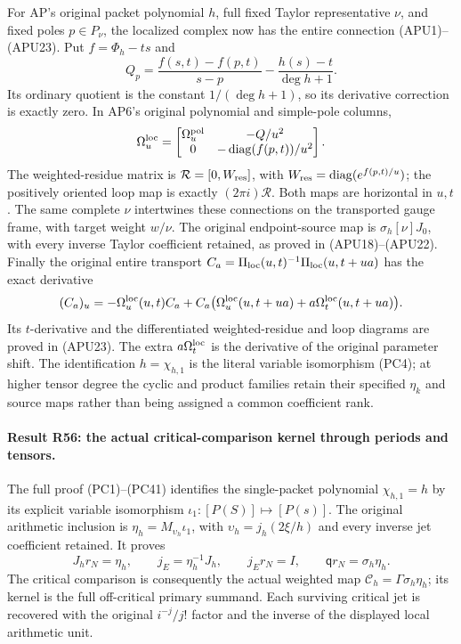 For AP's original packet polynomial \(h\), full fixed Taylor
representative \(\nu\), and fixed poles \(p\in P_\nu\), the
localized complex now has the entire connection
(APU1)--(APU23).  Put \(f=\Phi_h-ts\) and
\[
 Q_p=\frac{f(s,t)-f(p,t)}{s-p}-\frac{h(s)-t}{\deg h+1}.
\]
Its ordinary quotient is the constant \(1/(\deg h+1)\), so
its derivative correction is exactly zero.  In AP6's original
polynomial and simple-pole columns,
\[
 \Omega_u^{\rm loc}
 =\begin{bmatrix}
      \Omega_u^{\rm pol}&-Q/u^2\\
      0&-\operatorname{diag}(f(p,t))/u^2
   \end{bmatrix}.
\]
The weighted-residue matrix is
\(\mathcal R=[0,W_{\rm res}]\), with
\(W_{\rm res}=\operatorname{diag}(e^{f(p,t)/u})\);
the positively oriented loop map is exactly
\((2\pi i)\mathcal R\).
Both maps are horizontal in \(u,t\).
The same complete \(\nu\) intertwines these connections on
the transported gauge frame, with target weight \(w/\nu\).
The original endpoint-source map is
\(\sigma_h[\nu]J_0\), with every inverse Taylor coefficient
retained, as proved in (APU18)--(APU22).
Finally the original entire transport
\(C_a=\Pi_{\rm loc}(u,t)^{-1}\Pi_{\rm loc}(u,t+ua)\)
has the exact derivative
\[
 (C_a)_u=-\Omega_u^{\rm loc}(u,t)C_a+
 C_a\bigl(\Omega_u^{\rm loc}(u,t+ua)
                   +a\Omega_t^{\rm loc}(u,t+ua)\bigr).
\]
Its \(t\)-derivative and the differentiated weighted-residue and
loop diagrams are proved in (APU23).  The extra
\(a\Omega_t^{\rm loc}\) is the derivative of the original
parameter shift.  The identification \(h=\chi_{h,1}\) is the
literal variable isomorphism (PC4); at higher tensor degree the
cyclic and product families retain their specified
\(\eta_k\) and source maps rather than being assigned a common
coefficient rank.


\paragraph{Result R56: the actual critical-comparison kernel through periods and tensors.}
The full proof (PC1)--(PC41) identifies the single-packet polynomial
\(\chi_{h,1}=h\) by its explicit variable isomorphism
\(\iota_1:[P(S)]\mapsto[P(s)]\). The original arithmetic
inclusion is \(\eta_h=M_{\upsilon_h}\iota_1\), with
\(\upsilon_h=j_h(2\xi/h)\) and every inverse jet coefficient
retained. It proves
\[
 J_hr_N=\eta_h,\qquad j_E=\eta_h^{-1}J_h,\qquad
 j_Er_N=I,\qquad \mathsf q r_N=\sigma_h\eta_h.
\]
The critical comparison is consequently the actual weighted map
\(\mathcal C_h=\Gamma\sigma_h\eta_h\); its kernel is the full
off-critical primary summand. Each surviving critical jet is
recovered with the original \(i^{-j}/j!\) factor and the inverse
of the displayed local arithmetic unit.

